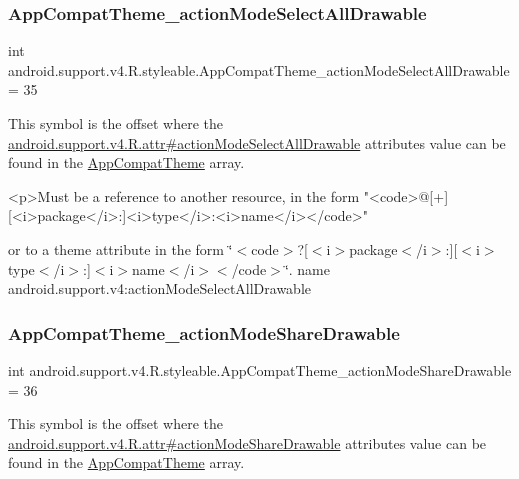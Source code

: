 \subsubsection{\texorpdfstring{App\+Compat\+Theme\+\_\+action\+Mode\+Select\+All\+Drawable}{AppCompatTheme\_actionModeSelectAllDrawable}}
{\footnotesize\ttfamily int android.\+support.\+v4.\+R.\+styleable.\+App\+Compat\+Theme\+\_\+action\+Mode\+Select\+All\+Drawable = 35\hspace{0.3cm}{\ttfamily [static]}}

This symbol is the offset where the \hyperlink{classandroid_1_1support_1_1v4_1_1R_1_1attr_a2929ce0a70ac3302a375444e27907f6c}{android.\+support.\+v4.\+R.\+attr\#action\+Mode\+Select\+All\+Drawable} attribute\textquotesingle{}s value can be found in the \hyperlink{classandroid_1_1support_1_1v4_1_1R_1_1styleable_ac07ebbe62ed977f6dcaadc6397840ace}{App\+Compat\+Theme} array.

\begin{DoxyVerb}      <p>Must be a reference to another resource, in the form "<code>@[+][<i>package</i>:]<i>type</i>:<i>name</i></code>"
\end{DoxyVerb}
 or to a theme attribute in the form \char`\"{}$<$code$>$?\mbox{[}$<$i$>$package$<$/i$>$\+:\mbox{]}\mbox{[}$<$i$>$type$<$/i$>$\+:\mbox{]}$<$i$>$name$<$/i$>$$<$/code$>$\char`\"{}.  name android.\+support.\+v4\+:action\+Mode\+Select\+All\+Drawable \mbox{\label{classandroid_1_1support_1_1v4_1_1R_1_1styleable_a88501ea40bddb326cfe337c4c21f7488}} 
\subsubsection{\texorpdfstring{App\+Compat\+Theme\+\_\+action\+Mode\+Share\+Drawable}{AppCompatTheme\_actionModeShareDrawable}}
{\footnotesize\ttfamily int android.\+support.\+v4.\+R.\+styleable.\+App\+Compat\+Theme\+\_\+action\+Mode\+Share\+Drawable = 36\hspace{0.3cm}{\ttfamily [static]}}

This symbol is the offset where the \hyperlink{classandroid_1_1support_1_1v4_1_1R_1_1attr_ace6b57b0bac24578fdda081a9f2f05b9}{android.\+support.\+v4.\+R.\+attr\#action\+Mode\+Share\+Drawable} attribute\textquotesingle{}s value can be found in the \hyperlink{classandroid_1_1support_1_1v4_1_1R_1_1styleable_ac07ebbe62ed977f6dcaadc6397840ace}{App\+Compat\+Theme} array.

